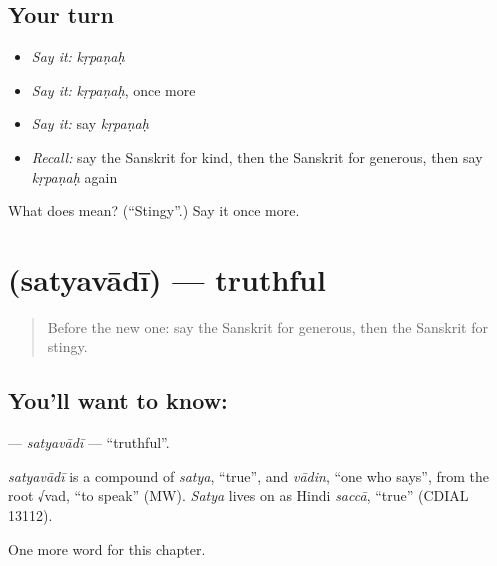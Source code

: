 \subsection*{Your turn}
\begin{itemize}
\raggedright
  \item \emph{Say it:} \emph{kṛpaṇaḥ}
  \item \emph{Say it:} \emph{kṛpaṇaḥ}, once more
  \item \emph{Say it:} say \emph{kṛpaṇaḥ}
  \item \emph{Recall:} say the Sanskrit for kind, then the Sanskrit for generous, then say \emph{kṛpaṇaḥ} again
\end{itemize}

\begin{tcolorbox}[breakable,colback=teal!4,colframe=teal!35!black,title={Before you move on}]
What does  mean? (\textquotedblleft{}Stingy\textquotedblright{}.) Say it once more.
\end{tcolorbox}
\section[\texorpdfstring{\sk{सत्यवादी} (satyavādī)}{सत्यवादी (satyavādī)}]{ (satyavādī) — truthful}

\label{lesson:SA-C187-satyavadi}



\begin{quote}
Before the new one: say the Sanskrit for generous, then the Sanskrit for stingy.
\end{quote}

\subsection*{You'll want to know: }
\textbf{} — \emph{satyavādī} — \textquotedblleft{}truthful\textquotedblright{}.

\begin{cousinweb}
\emph{satyavādī} is a compound of \emph{satya}, \textquotedblleft{}true\textquotedblright{}, and \emph{vādin}, \textquotedblleft{}one who says\textquotedblright{}, from the root √vad, \textquotedblleft{}to speak\textquotedblright{} (MW). \emph{Satya} lives on as Hindi \emph{saccā}, \textquotedblleft{}true\textquotedblright{} (CDIAL 13112).
\end{cousinweb}

\begin{grammarlens}[title={What you've built}]
One more word for this chapter.
\end{grammarlens}

